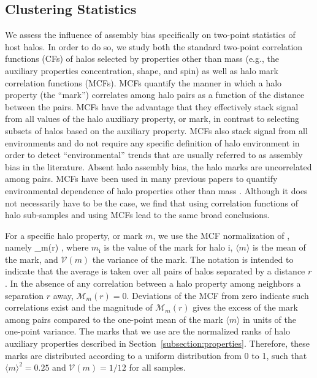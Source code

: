 \documentclass[usenatbib,fleqn]{mnras}
\begin{document}
\subsection{Clustering Statistics}
\label{subsection:clusteringstatistics}


We assess the influence of assembly bias specifically on two-point statistics of host halos. In order to do so, we study both the standard two-point correlation functions (CFs) of halos selected by properties other than mass (e.g., the auxiliary properties concentration, shape, and spin) as well as halo mark correlation functions
(MCFs). MCFs quantify the manner in which a halo property (the ``mark'') correlates among halo pairs as a function of the distance between the pairs. MCFs have the advantage that they effectively stack signal from all values of the halo auxiliary property, or mark, in contrast to selecting subsets of halos based on the auxiliary property. MCFs also stack signal from all environments and do not require any specific definition of halo environment in order to detect ``environmental'' trends that are usually referred to as assembly bias in the literature. Absent halo assembly bias, the halo marks are uncorrelated among pairs. MCFs have been used in many previous papers to quantify environmental dependence of halo properties other than mass \citep{sheth_tormen04,sheth05, harker_etal06,wechsler_etal06,mao_etal15}. 
Although it does not necessarily have to be the case, we find that using correlation functions of halo sub-samples and using MCFs lead to the same broad conclusions. 

For a specific halo property, or mark $m$, we use the MCF normalization of \citet{wechsler_etal06}, namely 
%
\beq
{}_m(r) \equiv {},
\eeq
%
where $m_{\mathrm{i}}$ is the value of the mark for halo $\mathrm{i}$, $\langle m \rangle$ is the mean of the mark, and $\mathcal{V}(m)$ the variance of the mark. The notation is intended to indicate that the average is taken over all pairs of halos separated by a distance $r$. In the absence of any correlation between a halo
property among neighbors a separation $r$ away, $\mathcal{M}_m(r) = 0$. Deviations of the MCF from zero indicate such correlations exist and the magnitude of $\mathcal{M}_m(r)$ gives the excess of the mark among pairs compared to the one-point mean of the mark $\langle m\rangle$ in units of the one-point variance. The marks that we use are the normalized ranks of halo auxiliary properties described in Section~\ref{subsection:properties}. Therefore, these marks are distributed according 
to a uniform distribution from 0 to 1, such that $\langle m \rangle^2 = 0.25$ and $\mathcal{V}(m) = 1/12$ for all samples.
\end{document}
